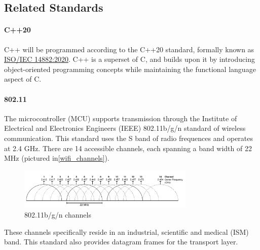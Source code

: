 \subsection{Related Standards}
\paragraph{C++20} C++ will be programmed according to the C++20 standard, formally known as
\href{https://www.iso.org/standard/79358.html}{ISO/IEC 14882:2020}. C++ is
a superset of C, and builds upon it by introducing object-oriented
programming concepts while maintaining the functional language aspect of C.

\paragraph{802.11} The microcontroller (MCU) supports transmission through the Institute of
Electrical and Electronics Engineers (IEEE) 802.11b/g/n standard of wireless
communication. This standard uses the S band of radio frequences and
operates at 2.4 GHz. There are 14 accessible channels, each spanning a band
width of 22 MHz (pictured in\autoref{wifi_channels}).
\begin{figure}[H]
    \caption{802.11b/g/n channels}
    \label{wifi_channels}
    \centering
    \includegraphics[width=0.75\textwidth]{images/wifi_channels.png}
\end{figure}
These channels specifically reside in an industrial, scientific and medical
(ISM) band. This standard also provides datagram frames for the transport
layer.

